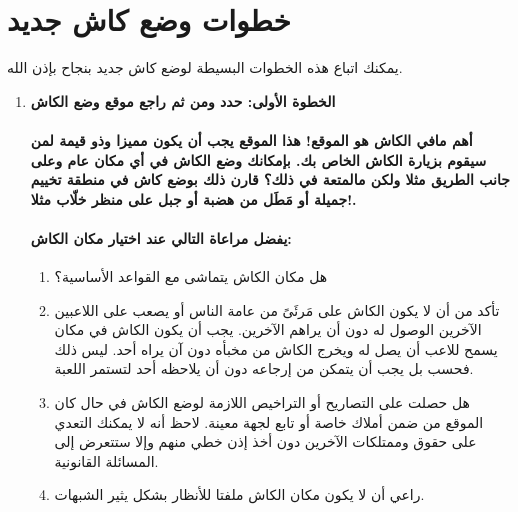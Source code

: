 \documentclass[12pt,a4paper,onecolumn,notitlepage]{book}
\begin{document}
\section*{خطوات وضع كاش جديد}
\label{sec:خطوات وضع كاش جديد}
يمكنك اتباع هذه الخطوات البسيطة لوضع كاش جديد بنجاح بإذن الله.
\begin{enumerate}
\item\textbf{ الخطوة الأولى: حدد ومن ثم راجع موقع وضع الكاش}
\paragraph{أهم مافي الكاش هو الموقع! هذا الموقع يجب أن يكون مميزا وذو قيمة لمن سيقوم بزيارة الكاش الخاص بك. بإمكانك وضع الكاش في أي مكان عام وعلى جانب الطريق مثلا ولكن مالمتعة في ذلك؟ قارن ذلك بوضع كاش في منطقة تخييم جميلة أو مَطَل من هضبة أو جبل على منظر خلّاب مثلا!.}

\paragraph{يفضل مراعاة التالي عند اختيار مكان الكاش:}

\begin{enumerate}
\item هل مكان الكاش يتماشى مع القواعد الأساسية؟
\item تأكد من أن لا يكون الكاش على مَرئَىً من عامة الناس أو يصعب على اللاعبين الآخرين الوصول له دون أن يراهم الآخرين. يجب أن يكون الكاش في مكان يسمح للاعب أن يصل له ويخرج الكاش من مخبأه دون آن يراه أحد. ليس ذلك فحسب بل يجب أن يتمكن من إرجاعه دون أن يلاحظه أحد لتستمر اللعبة.
\item هل حصلت على التصاريح أو التراخيص اللازمة لوضع الكاش في حال كان الموقع من ضمن أملاك خاصة أو تابع لجهة معينة. لاحظ أنه لا يمكنك التعدي على حقوق وممتلكات الآخرين دون أخذ إذن خطي منهم وإلا ستتعرض إلى المسائلة القانونية.
\item راعي أن لا يكون مكان الكاش ملفتا للأنظار بشكل يثير الشبهات.


\end{enumerate}
\end{enumerate}
\end{document}
